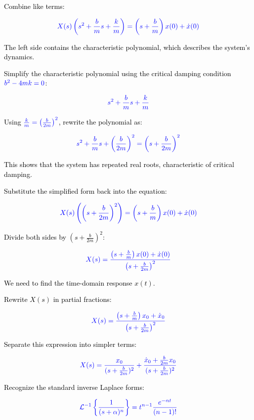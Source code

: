 \documentclass[12pt]{article}
\begin{document}
\noindent
\textcolor{black}{Combine like terms:}

\[
	\textcolor{blue}{X(s) \left( s^2 + \frac{b}{m}s + \frac{k}{m} \right) = \left(s + \frac{b}{m}\right)x(0) + \dot{x}(0)}
\]

\noindent
\textcolor{black}{The left side contains the characteristic polynomial, which describes the system's dynamics.}

\noindent
\textcolor{black}{Simplify the characteristic polynomial using the critical damping condition \(\textcolor{blue}{b^2 - 4mk = 0}\):}

\[
	\textcolor{blue}{s^2 + \frac{b}{m}s + \frac{k}{m}}
\]

\noindent
\textcolor{black}{Using \(\textcolor{blue}{\frac{k}{m} = \left(\frac{b}{2m}\right)^2}\), rewrite the polynomial as:}

\[
	\textcolor{blue}{s^2 + \frac{b}{m}s + \left(\frac{b}{2m}\right)^2 = \left(s + \frac{b}{2m}\right)^2}
\]

\noindent
\textcolor{black}{This shows that the system has repeated real roots, characteristic of critical damping.}

\noindent
\textcolor{black}{Substitute the simplified form back into the equation:}

\[
	\textcolor{blue}{X(s) \left( \left(s + \frac{b}{2m}\right)^2 \right) = \left(s + \frac{b}{m}\right)x(0) + \dot{x}(0)}
\]

\noindent
\textcolor{black}{Divide both sides by \(\left(s + \frac{b}{2m}\right)^2\):}

\[
	\textcolor{blue}{X(s) = \frac{\left(s + \frac{b}{m}\right)x(0) + \dot{x}(0)}{\left(s + \frac{b}{2m}\right)^2}}
\]

\noindent
\textcolor{black}{We need to find the time-domain response \( x(t) \).}

\noindent
\textcolor{black}{Rewrite \( X(s) \) in partial fractions:}

\[
	\textcolor{blue}{X(s) = \frac{\left(s + \frac{b}{m}\right)x_0 + \dot{x}_0}{\left(s + \frac{b}{2m}\right)^2}}
\]

\noindent
\textcolor{black}{Separate this expression into simpler terms:}

\[
	\textcolor{blue}{X(s) = \frac{x_0}{(s + \frac{b}{2m})^2} + \frac{\dot{x}_0 + \frac{b}{2m}x_0}{(s + \frac{b}{2m})^2}}
\]

\noindent
\textcolor{black}{Recognize the standard inverse Laplace forms:}

\[
	\textcolor{blue}{\mathcal{L}^{-1}\left\{\frac{1}{(s + \alpha)^n}\right\} = t^{n-1} \frac{e^{-\alpha t}}{(n-1)!}}
\]
\end{document}
